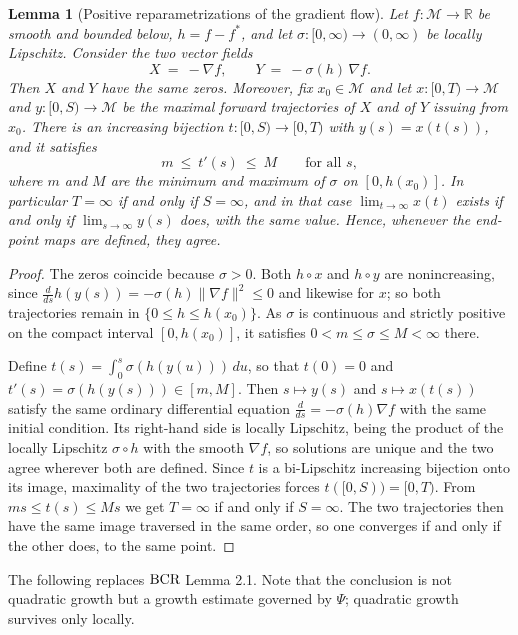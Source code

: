 \documentclass[11pt]{article}
\theoremstyle{plain}
\newtheorem{lem}[thm]{Lemma}
\theoremstyle{definition}
\theoremstyle{remark}
\newcommand{\M}{\mathcal{M}}
\newcommand{\R}{\mathbb{R}}
\newcommand{\bcr}{\textup{BCR}}
\begin{document}
\begin{lem}[Positive reparametrizations of the gradient flow]\label{lem:reparam}
Let $f\colon\M\to\R$ be smooth and bounded below, $h=f-f^*$, and let
$\sigma\colon[0,\infty)\to(0,\infty)$ be locally Lipschitz. Consider the two vector
fields
\[
  X \ =\ -\nabla f , \qquad Y \ =\ -\sigma(h)\,\nabla f .
\]
Then $X$ and $Y$ have the same zeros. Moreover, fix $x_0\in\M$ and let
$x\colon[0,T)\to\M$ and $y\colon[0,S)\to\M$ be the maximal forward trajectories of
$X$ and of $Y$ issuing from $x_0$. There is an increasing bijection
$t\colon[0,S)\to[0,T)$ with $y(s)=x(t(s))$, and it satisfies
\[
  m \ \le\ t'(s) \ \le\ M \qquad\text{for all } s ,
\]
where $m$ and $M$ are the minimum and maximum of $\sigma$ on $[0,h(x_0)]$. In
particular $T=\infty$ if and only if $S=\infty$, and in that case
$\lim_{t\to\infty}x(t)$ exists if and only if $\lim_{s\to\infty}y(s)$ does, with
the same value. Hence, whenever the end-point maps are defined, they agree.
\end{lem}

\begin{proof}
The zeros coincide because $\sigma>0$. Both $h\circ x$ and $h\circ y$ are
nonincreasing, since $\tfrac{d}{ds}h(y(s)) = -\sigma(h)\|\nabla f\|^2 \le 0$ and
likewise for $x$; so both trajectories remain in $\{0\le h\le h(x_0)\}$. As
$\sigma$ is continuous and strictly positive on the compact interval
$[0,h(x_0)]$, it satisfies $0<m\le\sigma\le M<\infty$ there.

Define $t(s) = \int_0^s \sigma(h(y(u)))\,du$, so that $t(0)=0$ and
$t'(s)=\sigma(h(y(s)))\in[m,M]$. Then $s\mapsto y(s)$ and $s\mapsto x(t(s))$
satisfy the same ordinary differential equation
$\tfrac{d}{ds} = -\sigma(h)\nabla f$ with the same initial condition. Its right-hand
side is locally Lipschitz, being the product of the locally Lipschitz
$\sigma\circ h$ with the smooth $\nabla f$, so solutions are unique and the two
agree wherever both are defined. Since $t$ is a bi-Lipschitz increasing
bijection onto its image, maximality of the two trajectories forces
$t([0,S)) = [0,T)$. From $ms\le t(s)\le Ms$ we get $T=\infty$ if and only if
$S=\infty$. The two trajectories then have the same image traversed in the same
order, so one converges if and only if the other does, to the same point.
\end{proof}

The following replaces $\bcr$ Lemma 2.1. Note that the conclusion is not
quadratic growth but a growth estimate governed by $\Psi$; quadratic growth
survives only locally.
\end{document}
